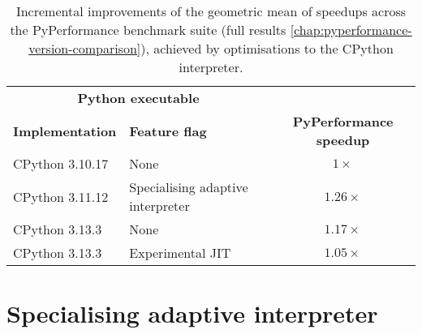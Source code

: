 \begin{table}[H]
  \caption{Incremental improvements of the geometric mean of speedups across the PyPerformance benchmark suite (full results \autoref{chap:pyperformance-version-comparison}), achieved by optimisations to the CPython interpreter.}
  \label{tab:faster-cpython}
  \centering
  \begin{tabular}{llc}
    \toprule
    \multicolumn{2}{c}{\textbf{Python executable}} \\
    \cmidrule(r){1-2}
    \textbf{Implementation} & \textbf{Feature flag} & \textbf{PyPerformance speedup} \\
    \midrule
    CPython 3.10.17 & None & $1\times$ \\
    CPython 3.11.12 & Specialising adaptive interpreter & $1.26\times$ \\
    CPython 3.13.3 & None & $1.17\times$ \\
    CPython 3.13.3 & Experimental JIT & $1.05\times$ \\
    \bottomrule
  \end{tabular}
\end{table}


\section{Specialising adaptive interpreter}
\label{sec:specialising-adaptive-interpreter}

